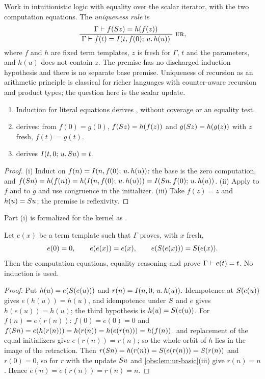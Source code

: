 Work in intuitionistic logic with equality over the scalar iterator, with the
two computation equations. The \emph{uniqueness rule} is
\[
\infrule{\Gamma\proves f(\Suc z)=h(f(z))}{\Gamma\proves f(t)=\It{t}{f(0)}{u}{h(u)}}\ \rulename{UR},
\]
where $f$ and $h$ are fixed term templates, $z$ is fresh for $\Gamma$, $t$ and
the parameters, and $h(u)$ does not contain $z$. The premise has no discharged
induction hypothesis and there is no separate base premise. Uniqueness of
recursion as an arithmetic principle is classical for richer languages with
counter-aware recursion and product types; the question here is the scalar
update.

\begin{lemma}
\label{obs:lem:ur-basic}
\begin{enumerate}[label=(\roman*)]
\item Induction for literal equations derives , without coverage
or an equality test.
\item {} derives: from $f(0)=g(0)$, $f(S z)=h(f(z))$ and
$g(S z)=h(g(z))$ with $z$ fresh, $f(t)=g(t)$.
\item {} derives $I(t,0;\,u.\,S u)=t$.
\end{enumerate}
\end{lemma}

\begin{proof}
(i) Induct on $f(n)=I(n,f(0);\,u.\,h(u))$: the base is the zero computation,
and $f(S n)=h(f(n))=h(I(n,f(0);\,u.\,h(u)))=I(S n,f(0);\,u.\,h(u))$.
(ii) Apply  to $f$ and to $g$ and use congruence in the
initializer. (iii) Take $f(z)=z$ and $h(u)=S u$; the premise is
reflexivity.
\end{proof}

Part (i) is formalized for the kernel as .

\begin{lemma}
\label{obs:lem:retraction}
Let $e(x)$ be a term template such that $\Gamma$ proves, with $x$ fresh,
\[
e(0)=0,\qquad e(e(x))=e(x),\qquad e(S(e(x)))=S(e(x)).
\]
Then the computation equations, equality reasoning and  prove
$\Gamma\vdash e(t)=t$. No induction is used.
\end{lemma}

\begin{proof}
Put $h(u)=e(S(e(u)))$ and $r(n)=I(n,0;\,u.\,h(u))$. Idempotence at
$S(e(u))$ gives $e(h(u))=h(u)$, and idempotence under $S$ and $e$ gives
$h(e(u))=h(u)$; the third hypothesis is $h(u)=S(e(u))$. For
$f(n)=e(r(n))$: $f(0)=e(0)=0$ and
$f(S n)=e(h(r(n)))=h(r(n))=h(e(r(n)))=h(f(n))$.  and
replacement of the equal initializers give $e(r(n))=r(n)$; so the whole orbit
of $h$ lies in the image of the retraction. Then
$r(S n)=h(r(n))=S(e(r(n)))=S(r(n))$ and $r(0)=0$, so  for
$r$ with the update $S u$ and \cref{obs:lem:ur-basic}(iii) give $r(n)=n$.
Hence $e(n)=e(r(n))=r(n)=n$.
\end{proof}

